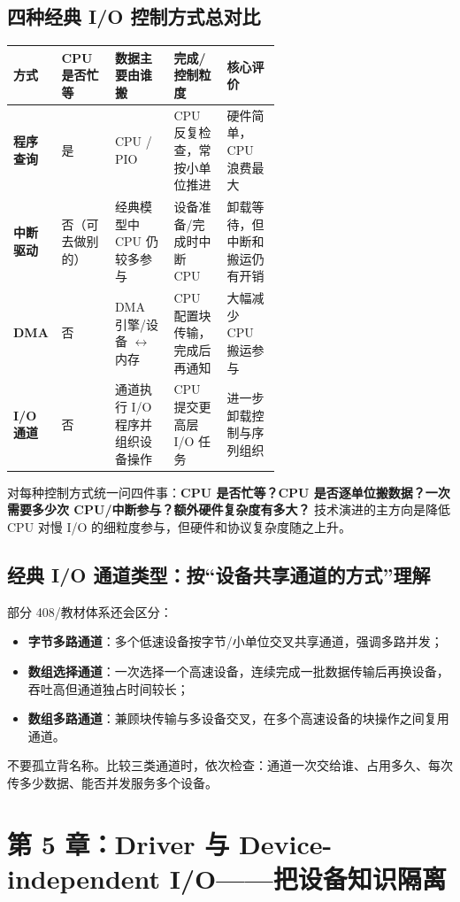 \documentclass[UTF8,fontset=fandol,11pt,a4paper]{ctexart}
\newcommand{\kw}[1]{\textbf{#1}}
\begin{document}
\subsection{四种经典 I/O 控制方式总对比}
\begingroup
\small
\renewcommand{\arraystretch}{1.25}
\setlength{\tabcolsep}{6pt}
\begin{tabularx}{\linewidth}{>{\bfseries}p{0.18\linewidth} p{0.2\linewidth} p{0.22\linewidth} X X}
\toprule
方式 & CPU 是否忙等 & 数据主要由谁搬 & 完成/控制粒度 & 核心评价 \\
\midrule
程序查询 & 是 & CPU / PIO & CPU 反复检查，常按小单位推进 & 硬件简单，CPU 浪费最大 \\
中断驱动 & 否（可去做别的） & 经典模型中 CPU 仍较多参与 & 设备准备/完成时中断 CPU & 卸载等待，但中断和搬运仍有开销 \\
DMA & 否 & DMA 引擎/设备 $\leftrightarrow$ 内存 & CPU 配置块传输，完成后再通知 & 大幅减少 CPU 搬运参与 \\
I/O 通道 & 否 & 通道执行 I/O 程序并组织设备操作 & CPU 提交更高层 I/O 任务 & 进一步卸载控制与序列组织 \\
\bottomrule
\end{tabularx}
\endgroup

\begin{exam}
对每种控制方式统一问四件事：\kw{CPU 是否忙等？CPU 是否逐单位搬数据？一次需要多少次 CPU/中断参与？额外硬件复杂度有多大？} 技术演进的主方向是降低 CPU 对慢 I/O 的细粒度参与，但硬件和协议复杂度随之上升。
\end{exam}

\subsection{经典 I/O 通道类型：按“设备共享通道的方式”理解}
部分 408/教材体系还会区分：
\begin{itemize}
  \item \kw{字节多路通道}：多个低速设备按字节/小单位交叉共享通道，强调多路并发；
  \item \kw{数组选择通道}：一次选择一个高速设备，连续完成一批数据传输后再换设备，吞吐高但通道独占时间较长；
  \item \kw{数组多路通道}：兼顾块传输与多设备交叉，在多个高速设备的块操作之间复用通道。
\end{itemize}
不要孤立背名称。比较三类通道时，依次检查：通道一次交给谁、占用多久、每次传多少数据、能否并发服务多个设备。

\section{第 5 章：Driver 与 Device-independent I/O——把设备知识隔离}
\end{document}
